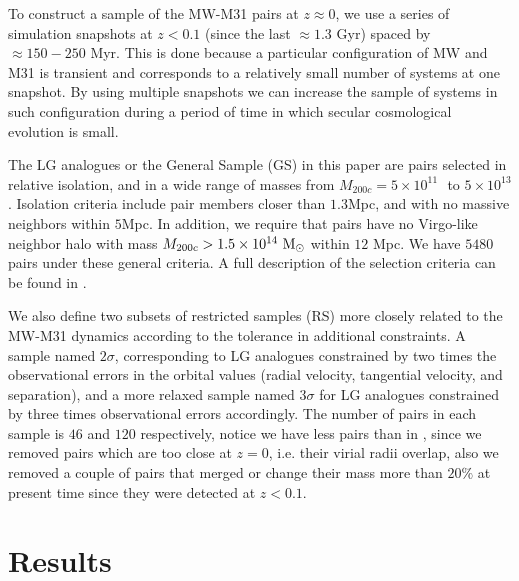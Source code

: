 \documentclass{emulateapj}
\newcommand{\mpc}{\rm{Mpc}}
\newcommand{\msun}{{\ifmmode{{\rm {M_{\odot}}}}\else{${\rm{M_{\odot}}}$}\fi}}
\providecommand{\DIFadd}[1]{{\protect\color{blue}\uwave{#1}}} %
\providecommand{\DIFdel}[1]{{\protect\color{red}\sout{#1}}}                      %
\providecommand{\DIFaddbegin}{} %
\providecommand{\DIFaddend}{} %
\providecommand{\DIFdelbegin}{} %
\providecommand{\DIFdelend}{} %
\begin{document}
To construct a sample of the MW-M31 pairs at \DIFdelbegin \DIFdel{$z\approx 0$}\DIFdelend \DIFaddbegin \DIFadd{$z\sim 0$}\DIFaddend , we use a
series of simulation snapshots  at $z<0.1$ (since the last \DIFdelbegin \DIFdel{$\approx
1.3$ }\DIFdelend \DIFaddbegin \DIFadd{$\sim
1.3$ }\DIFaddend Gyr) spaced by \DIFdelbegin \DIFdel{$\approx 150-250$ }\DIFdelend \DIFaddbegin \DIFadd{$\sim 150-250$ }\DIFaddend Myr. 
This is done because a particular configuration of MW and M31 is transient and
corresponds to a relatively small number of systems at one
snapshot. 
By using multiple snapshots we can increase the sample of systems in
such configuration during a period of time in which secular
cosmological evolution is small.  

The LG analogues or the General Sample (GS) in this paper are pairs selected in
relative isolation, and in a wide range of masses from  $M_{200c}=5
\times 10^{11}$ \msun $ $ to $ 5 \times 10^{13}$ \msun.  
Isolation criteria include pair members closer than $1.3$\mpc,
 and with no massive neighbors within $5$\mpc.
In addition, we require that pairs have no Virgo-like neighbor halo
with mass $M_{200c}>1.5 \times 10^{14}\ \rm M_{\odot}$ within $12$
Mpc.  
We have $5480$ pairs under these general criteria. 
A full description of the selection criteria can be found in
\citet{lganalogues,sat}.   

We also define two subsets of restricted samples (RS) more closely
related to the MW-M31  dynamics according to the tolerance in
additional constraints. 
A sample named $2\sigma$, corresponding to LG analogues constrained by
two times the observational errors in the orbital values (radial
velocity, tangential velocity, and separation), and a more relaxed
sample named $3\sigma$ for LG analogues constrained by three times
observational errors accordingly.  
The number of pairs in each sample is $46$ and $120$ respectively,
notice we have less pairs than in \citet{lganalogues}, since
we removed pairs which are too close at $z=0$, i.e. their virial radii
overlap, also we removed a couple of pairs that merged or change their
mass more than $20\%$ at present time since they were detected at
$z<0.1$. 

\section{Results}
\label{sec:results}
\end{document}
